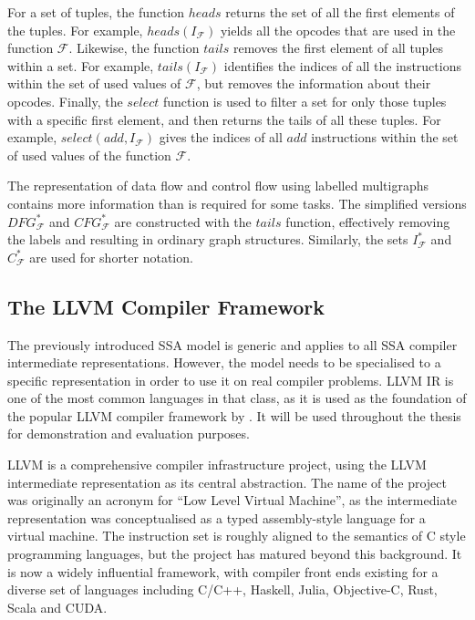     For a set of tuples, the function $heads$ returns the set of all the first
    elements of the tuples.
    For example, $heads(I_\mathcal F)$ yields all the opcodes that are used in
    the function $\mathcal F$.
    Likewise, the function $tails$ removes the first element of all
    tuples within a set.
    For example, $tails(I_\mathcal F)$ identifies the indices of all the
    instructions within the set of used values of $\mathcal F$, but removes the
    information about their opcodes.
    Finally, the $select$ function is used to filter a set for only those tuples
    with a specific first element, and then returns the tails of all these
    tuples.
    For example, $select(add,I_\mathcal F)$ gives the indices of all $add$
    instructions within the set of used values of the function $\mathcal F$.

    The representation of data flow and control flow using labelled multigraphs
    contains more information than is required for some tasks.
    The simplified versions $DFG_\mathcal F^*$ and $CFG_\mathcal F^*$ are
    constructed with the $tails$ function, effectively removing the labels and
    resulting in ordinary graph structures.
    Similarly, the sets $I_\mathcal F^*$ and $C_\mathcal F^*$ are used for
    shorter notation.

\subsection{The LLVM Compiler Framework}

    The previously introduced SSA model is generic and applies to all SSA
    compiler intermediate representations.
    However, the model needs to be specialised to a specific representation in
    order to use it on real compiler problems.
    LLVM IR is one of the most common languages in that class, as it is
    used as the foundation of the popular LLVM compiler framework by
    \citet{lattner2004llvm}.
    It will be used throughout the thesis for demonstration and evaluation
    purposes.

    LLVM is a comprehensive compiler infrastructure project, using the LLVM
    intermediate representation as its central abstraction.
    The name of the project was originally an acronym for
    ``Low Level Virtual Machine'', as the intermediate representation was
    conceptualised as a typed assembly-style language for a virtual machine.
    The instruction set is roughly aligned to the semantics of C style
    programming languages, but the project has matured beyond this background.
    It is now a widely influential framework, with compiler front ends existing
    for a diverse set of languages including C/C++, Haskell, Julia, Objective-C,
    Rust, Scala and CUDA.

